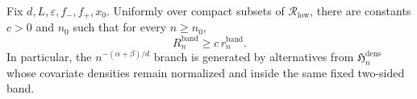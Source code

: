 Fix \(d,L,\varepsilon,f_{-},f_{+},x_0\). Uniformly over compact subsets of \(\mathcal{R}_{\mathrm{low}}\), there are constants \(c>0\) and \(n_0\) such that for every \(n\ge n_0\), \[R_n^{\mathrm{band}}\ge c\,r_n^{\mathrm{band}}.\] In particular, the \(n^{-(\alpha+\beta)/d}\) branch is generated by alternatives from \(\mathfrak{H}^{\mathrm{dens}}_n\) whose covariate densities remain normalized and inside the same fixed two-sided band.